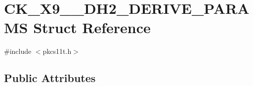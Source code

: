 \hypertarget{struct_c_k___x9__42___d_h2___d_e_r_i_v_e___p_a_r_a_m_s}{}\section{C\+K\+\_\+\+X9\+\_\+\_\+\+D\+H2\+\_\+\+D\+E\+R\+I\+V\+E\+\_\+\+P\+A\+R\+A\+MS Struct Reference}
\label{struct_c_k___x9__42___d_h2___d_e_r_i_v_e___p_a_r_a_m_s}


{\ttfamily \#include $<$pkcs11t.\+h$>$}

\subsection*{Public Attributes}
